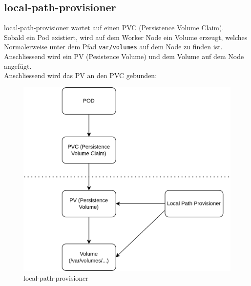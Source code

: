 
\begin{flushleft}
    \subsection{\gls{local-path-provisioner}}
    \gls{local-path-provisioner} wartet auf einen PVC (Persistence Volume Claim).\\
    Sobald ein Pod existiert, wird auf dem Worker Node ein Volume erzeugt, welches Normalerweise unter dem Pfad \texttt{var/volumes} auf dem Node zu finden ist.\\
    Anschliessend wird ein PV (Pesistence Volume) und dem Volume auf dem Node angefügt.\\
    Anschliessend wird das PV an den PVC gebunden:
    \begin{figure}[H]
        \centering
        \includegraphics[width=0.75\linewidth]{source/appendix/local-path-provisioner/local-path-provisioner}
        \caption{\gls{local-path-provisioner}\cite{ZTILPG8B}}
        \label{fig:local-path-provisioner}
    \end{figure}
\end{flushleft}